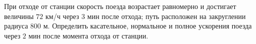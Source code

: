 При отходе от станции скорость поезда возрастает равномерно и достигает 
величины $72$ км/ч через $3$ мин после отхода; путь расположен на 
закруглении радиуса $800$ м. Определить касательное, нормальное и полное
ускорения поезда через $2$ мин после момента отхода от станции.
